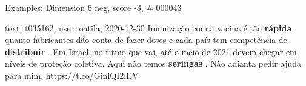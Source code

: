 \begin{frame}{Examples: Dimension 6 neg, score -3, \# 000043}
\footnotesize
\begin{alertblock}{text: t035162, user: oatila, 2020-12-30}
Imunização com a vacina é tão \textbf{rápida} quanto fabricantes dão conta de 
fazer doses e cada país tem competência de \textbf{distribuir} . Em Israel, no 
ritmo que vai, até o meio de 2021 devem chegar em níveis de proteção coletiva. 
Aqui não temos \textbf{seringas} . Não adianta pedir ajuda para mim. 
https://t.co/GinlQI2lEV 
\end{alertblock}
\end{frame}
